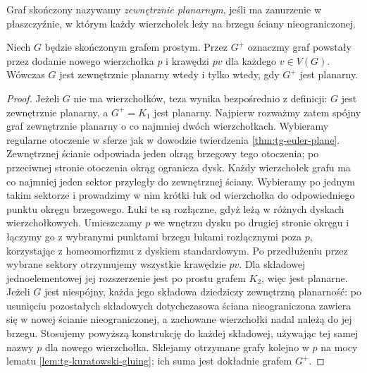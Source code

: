 \begin{definicja}
Graf skończony nazywamy \emph{zewnętrznie planarnym}, jeśli
ma zanurzenie w płaszczyźnie, w którym każdy wierzchołek
leży na brzegu ściany nieograniczonej.
\end{definicja}

\begin{twierdzenie}
\label{thm:tg-outerplanar-cone}
Niech $G$ będzie skończonym grafem prostym.
Przez $G^+$ oznaczmy graf powstały przez dodanie
nowego wierzchołka $p$ i krawędzi $pv$ dla każdego
$v\in V(G)$. Wówczas $G$ jest zewnętrznie planarny
wtedy i tylko wtedy, gdy $G^+$ jest planarny.
\end{twierdzenie}

\begin{proof}
Jeżeli $G$ nie ma wierzchołków, teza wynika
bezpośrednio z definicji: $G$ jest zewnętrznie
planarny, a $G^+=K_1$ jest planarny.
Najpierw rozważmy zatem spójny graf zewnętrznie
planarny o co najmniej dwóch wierzchołkach. Wybieramy regularne otoczenie
w sferze jak w dowodzie twierdzenia \ref{thm:tg-euler-plane}.
Zewnętrznej ścianie odpowiada jeden okrąg brzegowy
tego otoczenia; po przeciwnej stronie otoczenia
okrąg ogranicza dysk. Każdy wierzchołek grafu ma
co najmniej jeden sektor przyległy do zewnętrznej
ściany. Wybieramy po jednym takim sektorze
i prowadzimy w nim krótki łuk od wierzchołka
do odpowiedniego punktu okręgu brzegowego.
Łuki te są rozłączne, gdyż leżą w różnych dyskach
wierzchołkowych. Umieszczamy $p$ we wnętrzu
dysku po drugiej stronie okręgu i łączymy go
z wybranymi punktami brzegu łukami rozłącznymi
poza $p$, korzystając z homeomorfizmu z dyskiem
standardowym. Po przedłużeniu przez wybrane
sektory otrzymujemy wszystkie krawędzie $pv$.
Dla składowej jednoelementowej jej rozszerzenie
jest po prostu grafem $K_2$, więc jest planarne.
Jeżeli $G$ jest niespójny, każda jego składowa
dziedziczy zewnętrzną planarność: po usunięciu
pozostałych składowych dotychczasowa ściana
nieograniczona zawiera się w nowej ścianie
nieograniczonej, a zachowane wierzchołki nadal
należą do jej brzegu. Stosujemy powyższą konstrukcję
do każdej składowej, używając tej samej nazwy $p$
dla nowego wierzchołka. Sklejamy otrzymane grafy
kolejno w $p$ na mocy lematu
\ref{lem:tg-kuratowski-gluing}; ich suma jest
dokładnie grafem $G^+$.


\end{proof}
